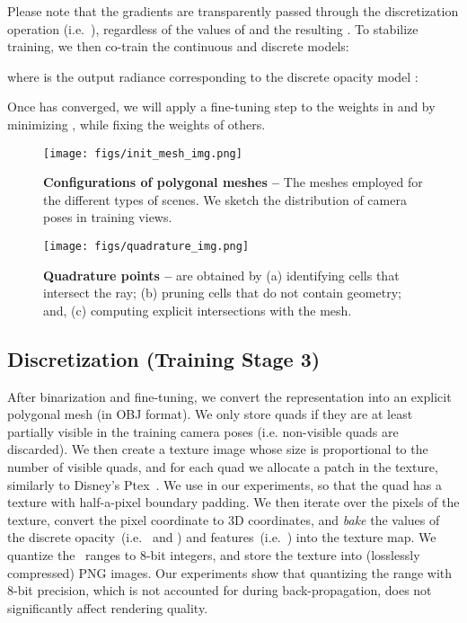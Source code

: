 Please note that the gradients are transparently passed through the discretization operation (i.e.~), regardless of the values of  and the resulting .
To stabilize training, we then co-train the continuous and discrete models:

where  is the output radiance corresponding to the discrete opacity model :

Once  has converged, we will apply a fine-tuning step to the weights in  and  by minimizing , while fixing the weights of others.


\begin{figure}[t!]
\begin{center}
\texttt{[image: figs/init\_mesh\_img.png]}
\end{center}
\caption{
\textbf{Configurations of polygonal meshes --}
The meshes employed for the different types of scenes.
We sketch the distribution of camera poses in training views.
}
\label{fig:init_mesh}
\end{figure}  \begin{figure}[t]
\begin{center}
\texttt{[image: figs/quadrature\_img.png]}
\end{center}
\caption{
\textbf{Quadrature points --} are obtained by
(a) identifying cells that intersect the ray; 
(b) pruning cells that do not contain geometry; and,
(c) computing explicit intersections with the mesh.}
\label{fig:quadrature}
\end{figure}  


\subsection{Discretization (Training Stage 3)}
\label{sec:stage3}
After binarization and fine-tuning, we convert the representation into an explicit polygonal mesh (in OBJ format).
We only store quads if they are at least partially visible in the training camera poses (i.e. non-visible quads are discarded).
We then create a texture image whose size is proportional to the number of visible quads, and for each quad we allocate a  patch in the texture, similarly to Disney's Ptex~\cite{burley2008ptex}.
We use  in our experiments, so that the quad has a  texture with half-a-pixel boundary padding.
We then iterate over the pixels of the texture, convert the pixel coordinate to 3D coordinates, and \textit{bake} the values of the discrete opacity~(i.e.~ and ) and features~(i.e.~) into the texture map.
We quantize the~ ranges to 8-bit integers, and store the texture into (losslessly compressed) PNG images.
Our experiments show that quantizing the  range with 8-bit precision, which is not accounted for during back-propagation, does not significantly affect rendering quality.


